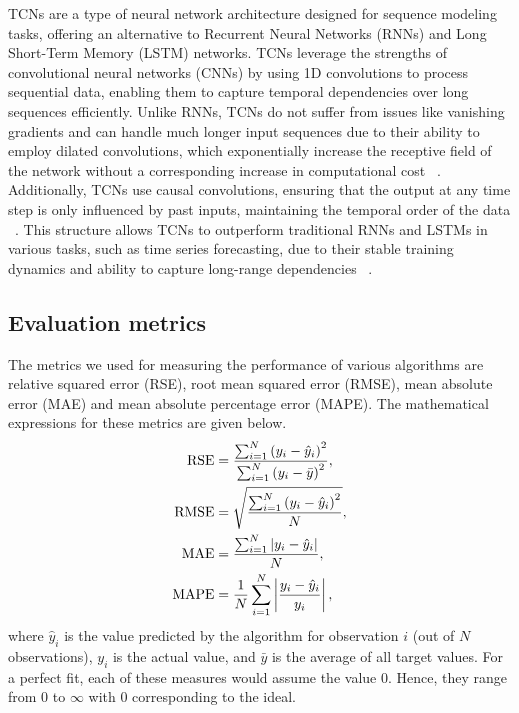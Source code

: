 TCNs are a type of neural network architecture designed for sequence modeling tasks, offering an alternative to Recurrent Neural Networks (RNNs) and Long Short-Term Memory (LSTM) networks. TCNs leverage the strengths of convolutional neural networks (CNNs) by using 1D convolutions to process sequential data, enabling them to capture temporal dependencies over long sequences efficiently. Unlike RNNs, TCNs do not suffer from issues like vanishing gradients and can handle much longer input sequences due to their ability to employ dilated convolutions, which exponentially increase the receptive field of the network without a corresponding increase in computational cost ~\citep{bai2018empirical}. Additionally, TCNs use causal convolutions, ensuring that the output at any time step is only influenced by past inputs, maintaining the temporal order of the data ~\citep{oord2016wavenet}. This structure allows TCNs to outperform traditional RNNs and LSTMs in various tasks, such as time series forecasting, due to their stable training dynamics and ability to capture long-range dependencies ~\citep{bai2018empirical}.

\subsection{Evaluation metrics}
\label{ssec:metric}

The metrics we used for measuring the performance of various algorithms are relative squared error (RSE), root mean squared error 
(RMSE), mean absolute error (MAE) and mean absolute percentage error (MAPE). The mathematical expressions for 
these metrics are given below.
%
\begin{align}
    \operatorname{RSE} &= \frac{\sum_{i=1}^N \left(y_i - \hat{y}_i\right)^2}{\sum_{i=1}^N \left(y_i - \bar{y}\right)^2}, \\
    \operatorname{RMSE} &= \sqrt{\frac{\sum_{i=1}^N \left(y_i - \hat{y}_i\right)^2}{N}}, \\
    \operatorname{MAE} &= \frac{\sum_{i=1}^N \left|{y_i - \hat{y}_i}\right|}{N}, \\
    \operatorname{MAPE} &= \frac{1}{N}\sum_{i=1}^N \left|{\frac{y_i - \hat{y}_i}{y_i}}\right|,
\end{align}
%
where $\hat{y}_i$ is the value predicted by the algorithm for observation $i$ (out of $N$ observations), $y_i$ is 
the actual value, and $\bar{y}$ is the average of all target values. For a perfect fit, each of these 
measures would assume the value $0$. Hence, they range from $0$ to $\infty$ with $0$ corresponding to 
the ideal.
